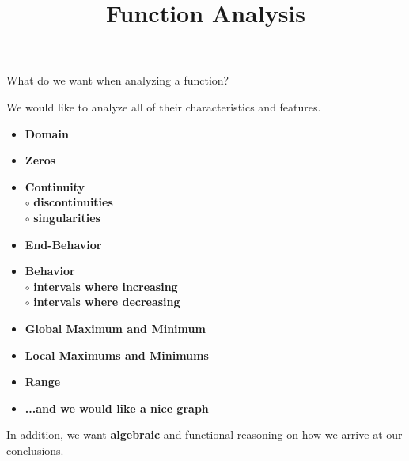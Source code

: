 \documentclass{ximera}
\title{Function Analysis}
\begin{document}
\begin{abstract}
%
\end{abstract}
\maketitle






What do we want when analyzing a function? 




We would like to analyze all of their characteristics and features. 



\begin{itemize}
     \item \textbf{\textcolor{red!70!black}{Domain}} 
     \item \textbf{\textcolor{red!70!black}{Zeros}} 
     \item \textbf{\textcolor{red!70!black}{Continuity}} \\
     \text{    }$\circ$ \textbf{\textcolor{purple!85!blue}{discontinuities}}\\
     \text{    }$\circ$ \textbf{\textcolor{purple!85!blue}{singularities}}\\
     \item \textbf{\textcolor{red!70!black}{End-Behavior}} 
     \item \textbf{\textcolor{red!70!black}{Behavior}} \\
     \text{    }$\circ$ \textbf{\textcolor{purple!85!blue}{intervals where increasing}}\\
     \text{    }$\circ$ \textbf{\textcolor{purple!85!blue}{intervals where decreasing}}\\
     \item \textbf{\textcolor{red!70!black}{Global Maximum and Minimum}} 
     \item \textbf{\textcolor{red!70!black}{Local Maximums and Minimums}} 
     \item \textbf{\textcolor{red!70!black}{Range}} 
     \item \textbf{\textcolor{blue!55!black}{...and we would like a nice graph}} 
\end{itemize}






In addition, we want \textbf{\textcolor{red!70!black}{algebraic}} and functional reasoning on how we arrive at our conclusions.
\end{document}
